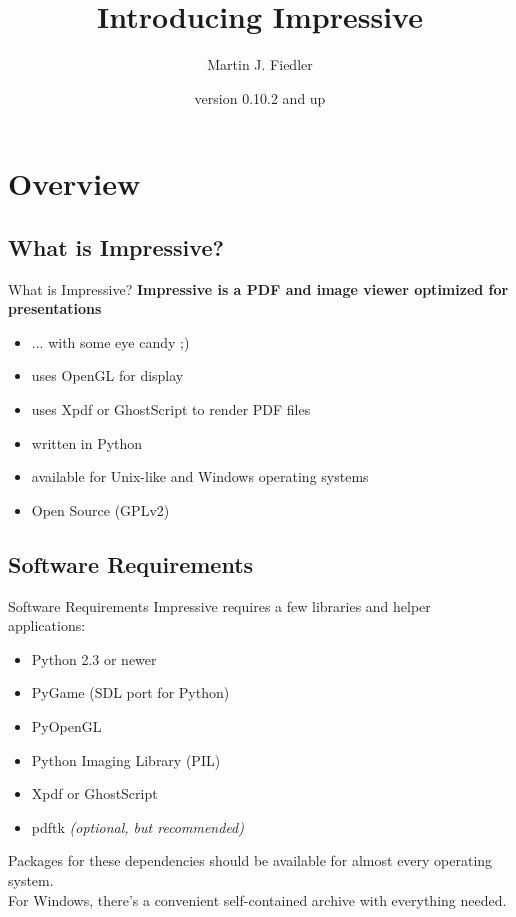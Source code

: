 \documentclass[bigger,hyperref={colorlinks=true,linkcolor=white,urlcolor=blue}]{beamer}
\title{Introducing Impressive}
\author{Martin J. Fiedler}
\date{version 0.10.2 and up}
\begin{document}
\maketitle


\section{Overview}

\subsection{What is Impressive?}
\begin{frame}{What is Impressive?}
    \large
    \textbf{Impressive is a PDF and image viewer optimized for presentations}
    \normalsize
    \begin{itemize}
        \item ... with some eye candy ;)
        \item uses OpenGL for display
        \item uses Xpdf or GhostScript to render PDF files
        \item written in Python
        \item available for Unix-like and Windows operating systems
        \item Open Source (GPLv2)
    \end{itemize}
\end{frame}

\subsection{Software Requirements}
\begin{frame}{Software Requirements}
    Impressive requires a few libraries and helper applications:
    \begin{itemize}
        \item Python 2.3 or newer
        \item PyGame (SDL port for Python)
        \item PyOpenGL
        \item Python Imaging Library (PIL)
        \item Xpdf or GhostScript
        \item pdftk \emph{(optional, but recommended)}
    \end{itemize}
    Packages for these dependencies should be available for almost every
    operating system. \\
    For Windows, there's a convenient self-contained archive with
    everything needed.
\end{frame}
\end{document}
